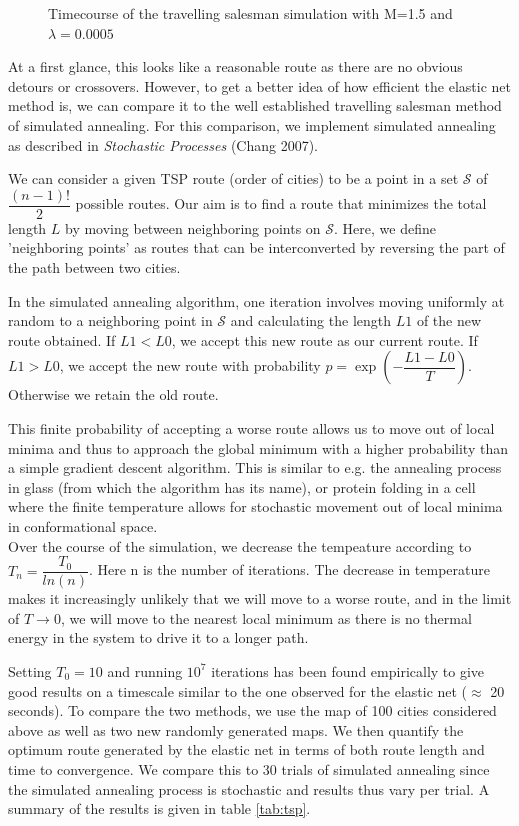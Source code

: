 \documentclass{article}
\begin{document}
\begin{figure}[h]
\begin{subfigure}[t]{0.24\linewidth}
		\label{fig:sim4}	
	\end{subfigure}%
\caption{Timecourse of the travelling salesman simulation with M=1.5 and $\lambda = 0.0005$}
\label{fig:tspsim}
\end{figure}

At a first glance, this looks like a reasonable route as there are no obvious detours or crossovers. However, to get a better idea of how efficient the elastic net method is, we can compare it to the well established travelling salesman method of simulated annealing. For this comparison, we implement simulated annealing as described in \textit{Stochastic Processes} (Chang 2007).

We can consider a given TSP route (order of cities) to be a point in a set $\mathcal{S}$ of $\dfrac{(n-1)!}{2}$ possible routes. Our aim is to find a route that minimizes the total length $L$ by moving between neighboring points on $\mathcal{S}$. Here, we define 'neighboring points' as routes that can be interconverted by reversing the part of the path between two cities.

In the simulated annealing algorithm, one iteration involves moving uniformly at random to a neighboring point in $\mathcal{S}$ and calculating the length $L1$ of the new route obtained.
If $L1 < L0$, we accept this new route as our current route.
If $L1 > L0$, we accept the new route with probability $p = \exp{(-\dfrac{L1-L0}{T})}$. Otherwise we retain the old route.

This finite probability of accepting a worse route allows us to move out of local minima and thus to approach the global minimum with a higher probability than a simple gradient descent algorithm. This is similar to e.g. the annealing process in glass (from which the algorithm has its name), or protein folding in a cell where the finite temperature allows for stochastic movement out of local minima in conformational space.\\
Over the course of the simulation, we decrease the tempeature according to
$
T_n = \dfrac{T_0}{ln(n)}
$.
Here n is the number of iterations. The decrease in temperature makes it increasingly unlikely that we will move to a worse route, and in the limit of $T \rightarrow 0$, we will move to the nearest local minimum as there is no thermal energy in the system to drive it to a longer path.

Setting $T_0=10$ and running $10^7$ iterations has been found empirically to give good results on a timescale similar to the one observed for the elastic net ($\approx$ 20 seconds).
To compare the two methods, we use the map of 100 cities considered above as well as two new randomly generated maps. We then quantify the optimum route generated by the elastic net in terms of both route length and time to convergence. We compare this to 30 trials of simulated annealing since the simulated annealing process is stochastic and results thus vary per trial. A summary of the results is given in table \ref{tab:tsp}.
\end{document}
